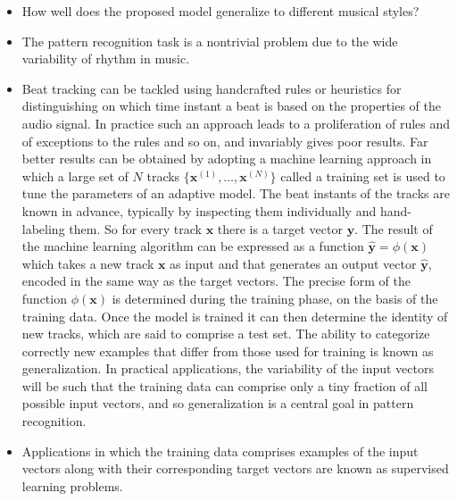 \documentclass{scrartcl}
\begin{document}
\begin{itemize}
\item How well does the proposed model generalize to different musical styles?
\item The pattern recognition task is a nontrivial problem due to the wide variability of rhythm in music. 
\item Beat tracking can be tackled using handcrafted rules or heuristics for distinguishing on which time instant a beat is based on the properties of the audio signal. In practice such an approach leads to a proliferation of rules and of exceptions to the rules and so on, and invariably gives poor results. Far better results can be obtained by adopting a machine learning approach in which a large set of $N$ tracks $\{\mathbf x^{(1)}, \dots, \mathbf x^{(N)}\}$ called a training set is used to tune the parameters of an adaptive model. The beat instants of the tracks are known in advance, typically by inspecting them individually and hand-labeling them. So for every track $\mathbf x$ there is a target vector $\mathbf y$. The result of the machine learning algorithm can be expressed as a function $\hat{\mathbf y} = \phi (\mathbf x)$ which takes a new track $\mathbf x$ as input and that generates an output vector $\hat{\mathbf y}$, encoded in the same way as the target vectors. The precise form of the function $\phi (\mathbf x)$ is determined during the training phase, on the basis of the training data. Once the model is trained it can then determine the identity of new tracks, which are said to comprise a test set. The ability to categorize correctly new examples that differ from those used for training is known as generalization. In practical applications, the variability of the input vectors will be such that the training data can comprise only a tiny fraction of all possible input vectors, and so generalization is a central goal in pattern recognition. 
\item Applications in which the training data comprises examples of the input vectors along with their corresponding target vectors are known as supervised learning problems. 
\end{itemize}
\end{document}
